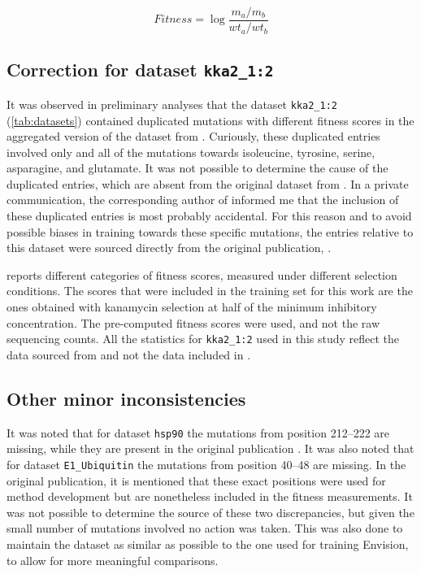 \begin{equation}\label{eq:fitness}
	Fitness = \log{\frac{m_a/m_b}{wt_a/wt_b}}
\end{equation}

\subsection{Correction for dataset \texttt{kka2\_1:2}}
It was observed in preliminary analyses that the dataset \texttt{kka2\_1:2} (\autoref{tab:datasets}) contained duplicated mutations with different fitness scores in the aggregated version of the dataset from \textcite{Gray2018}.
Curiously, these duplicated entries involved only and all of the mutations towards isoleucine, tyrosine, serine, asparagine, and glutamate.
It was not possible to determine the cause of the duplicated entries, which are absent from the original dataset from \textcite{Melnikov2014}.
In a private communication, the corresponding author of \textcite{Gray2018} informed me that the inclusion of these duplicated entries is most probably accidental.
For this reason and to avoid possible biases in training towards these specific mutations, the entries relative to this dataset were sourced directly from the original publication, \textcite{Melnikov2014}.

\textcite{Melnikov2014} reports different categories of fitness scores, measured under different selection conditions.
The scores that were included in the training set for this work are the ones obtained with kanamycin selection at half of the minimum inhibitory concentration.
The pre-computed fitness scores were used, and not the raw sequencing counts.
All the statistics for \texttt{kka2\_1:2} used in this study reflect the data sourced from \textcite{Melnikov2014} and not the data included in \textcite{Gray2018}.

\subsection{Other minor inconsistencies}\label{sec:minor_inconsistencies}
It was noted that for dataset \texttt{hsp90} the mutations from position \numrange{212}{222} are missing, while they are present in the original publication \parencite{Mishra2016}.
It was also noted that for dataset \texttt{E1\_Ubiquitin} the mutations from position \numrange{40}{48} are missing.
In the original publication, it is mentioned that these exact positions were used for method development but are nonetheless included in the fitness measurements.
It was not possible to determine the source of these two discrepancies, but given the small number of mutations involved no action was taken.
This was also done to maintain the dataset as similar as possible to the one used for training Envision, to allow for more meaningful comparisons.

